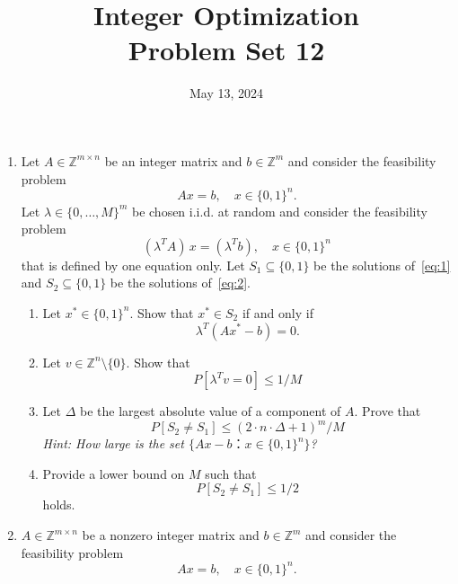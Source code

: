 \documentclass[11pt,a4paper]{article}
\title{Integer Optimization  \\ Problem Set 12 }
\date{ May 13, 2024}
\begin{document}
\maketitle 


\begin{enumerate}

\item Let $A ∈ ℤ^{ m ×n}$ be an integer matrix and $b ∈ ℤ^m$ and consider the feasibility problem 
  \begin{equation}
    \label{eq:1}
    Ax = b, \quad x ∈ \{0,1\}^n.  
  \end{equation}
  Let $λ ∈ \{0,\dots,M\}^m$ be chosen i.i.d. at random and consider the feasibility problem 
  \begin{equation}
    \label{eq:2}
    (λ^TA)\,  x = (λ^Tb), \quad x ∈ \{0,1\}^n 
  \end{equation}
  that is defined by one equation only. Let $S_1 ⊆ \{0,1\}$ be the solutions of~\eqref{eq:1} and $S_2 ⊆ \{0,1\}$ be the solutions of~\eqref{eq:2}.
  \begin{enumerate}
  \item Let $x^* ∈ \{0,1\}^n$. Show that $x^* ∈ S_2$ if and only if
    \begin{displaymath}
      λ^T (A x^* - b) = 0.
    \end{displaymath}
  \item Let $v ∈ℤ^n \setminus \{0\}$. Show that
    \begin{displaymath}
      P\left[ λ^T v = 0\right] ≤ 1/M 
    \end{displaymath}  
  \item Let $Δ$ be the largest absolute value of a component of $A$.  Prove that
    \begin{displaymath}
      P \left[ S_2 ≠ S_1\right] ≤ (2 ⋅ n ⋅ Δ +1)^m / M
    \end{displaymath}
\hfill     \emph{Hint: How large is the set $\{Ax - b ： x ∈ \{0,1\}^n \}$?} 
  \item Provide a lower bound on $M$ such that
     \begin{displaymath}
      P \left[ S_2 ≠ S_1\right] ≤  1/2
    \end{displaymath}
    holds. 
  \end{enumerate}
\item $A ∈ ℤ^{ m ×n}$ be a nonzero integer matrix and $b ∈ ℤ^m$ and consider the feasibility problem 
  \begin{equation} 
    \label{eq:3}
    Ax = b, \quad x ∈ \{0,1\}^n.  
  \end{equation}

\end{enumerate}
\end{document}
